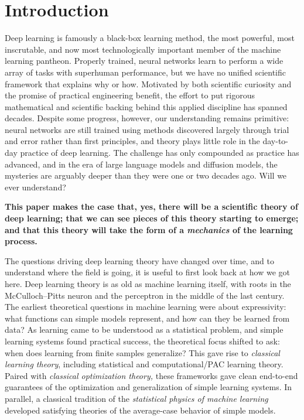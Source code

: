 \section{Introduction}
\label{sec:intro}


Deep learning is famously a black-box learning method, the most powerful, most inscrutable, and now most technologically important member of the machine learning pantheon.
Properly trained, neural networks learn to perform a wide array of tasks with superhuman performance, but we have no unified scientific framework that explains why or how.
Motivated by both scientific curiosity and the promise of practical engineering benefit, the effort to put rigorous mathematical and scientific backing behind this applied discipline has spanned decades.
Despite some progress, however, our understanding remains primitive: neural networks are still trained using methods discovered largely through trial and error rather than first principles, and theory plays little role in the day-to-day practice of deep learning.
The challenge has only compounded as practice has advanced, and in the era of large language models and diffusion models, the mysteries are arguably deeper than they were one or two decades ago.
Will we ever understand?

\vspace{2mm}
\begin{tcolorbox}
[sharp corners, colback=white, colframe=black]
    \textbf{
    \hspace{-1.5mm}
    This paper makes the case that, yes, there will be a scientific theory of deep learning; that we can see pieces of this theory starting to emerge; and that this theory will take the form of a \textit{mechanics} of the learning process.
    }
\end{tcolorbox}
\vspace{2mm}


The questions driving deep learning theory have changed over time, and to understand where the field is going, it is useful to first look back at how we got here.
Deep learning theory is as old as machine learning itself, with roots in the McCulloch--Pitts neuron and the perceptron in the middle of the last century.
The earliest theoretical questions in machine learning were about expressivity: what functions can simple models represent, and how can they be learned from data?
As learning came to be understood as a statistical problem, and simple learning systems found practical success, the theoretical focus shifted to ask: when does learning from finite samples generalize?
This gave rise to \textit{classical learning theory}, including statistical and computational/PAC learning theory.
Paired with \textit{classical optimization theory,} these frameworks gave clean end-to-end guarantees of the optimization and generalization of simple learning systems.
In parallel, a classical tradition of the \textit{statistical physics of machine learning} developed satisfying theories of the average-case behavior of simple models.



